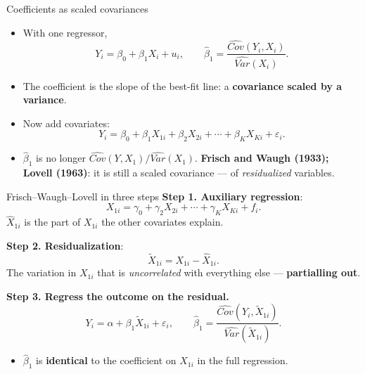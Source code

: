 \documentclass[
  11pt,
  ignorenonframetext,
  aspectratio=169,
]{beamer}
\providecommand{\tightlist}{%
  \setlength{\itemsep}{0pt}\setlength{\parskip}{0pt}}
\begin{document}
\begin{frame}{Coefficients as scaled covariances}
\protect{}\label{coefficients-as-scaled-covariances}
\begin{itemize}
\tightlist
\item
  With one regressor, \[
  Y_i = \beta_0 + \beta_1 X_i + u_i,
  \qquad
  \hat\beta_1 = \frac{\widehat{Cov}(Y_i, X_i)}{\widehat{Var}(X_i)} .
  \]
\item
  The coefficient is the slope of the best-fit line: a
  \textbf{covariance scaled by a variance}.
\item
  Now add covariates: \[
  Y_i = \beta_0 + \beta_1 X_{1i} + \beta_2 X_{2i} + \cdots + \beta_K X_{Ki} + \varepsilon_i .
  \]
\item
  \(\hat\beta_1\) is no longer
  \(\widehat{Cov}(Y, X_1)/\widehat{Var}(X_1)\). \textbf{Frisch and Waugh
  (1933); Lovell (1963)}: it is still a scaled covariance --- of
  \emph{residualized} variables.
\end{itemize}
\end{frame}

\begin{frame}{Frisch--Waugh--Lovell in three steps}
\protect{}\label{frischwaughlovell-in-three-steps}
\textbf{Step 1. Auxiliary regression}: \[
X_{1i} = \gamma_0 + \gamma_2 X_{2i} + \cdots + \gamma_K X_{Ki} + f_i .
\] \(\hat X_{1i}\) is the part of \(X_{1i}\) the other covariates
explain.

\textbf{Step 2. Residualization}: \[
\tilde X_{1i} = X_{1i} - \hat X_{1i} .
\] The variation in \(X_{1i}\) that is \emph{uncorrelated} with
everything else --- \textbf{partialling out}.

\textbf{Step 3. Regress the outcome on the residual.} \[
Y_i = \alpha + \beta_1 \tilde X_{1i} + \varepsilon_i,
\qquad
\hat\beta_1 = \frac{\widehat{Cov}(Y_i, \tilde X_{1i})}{\widehat{Var}(\tilde X_{1i})} .
\]

\begin{itemize}
\tightlist
\item
  \(\hat\beta_1\) is \textbf{identical} to the coefficient on \(X_{1i}\)
  in the full regression.
\end{itemize}
\end{frame}
\end{document}
